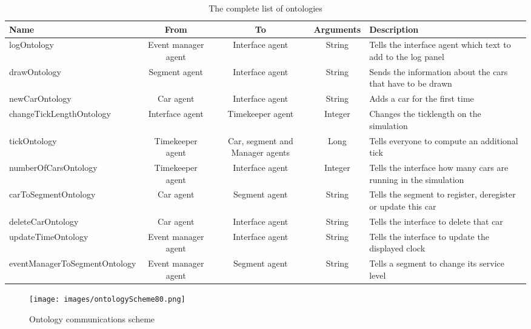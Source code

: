 \begin{table}[h]
\centering
\begin{adjustbox}{angle=90}    

\begin{tabularx}{\textheight}{|X|c|c|c|X|}
\hline 
\textbf{Name} & \textbf{From} & \textbf{To} & \textbf{Arguments} & \textbf{Description} \\ 
\hline 
logOntology & Event manager agent & Interface agent & String & Tells the interface agent which text to add to the log panel \\ 
\hline 
drawOntology & Segment agent & Interface agent & String & Sends the information about the cars that have to be drawn \\ 
\hline 
newCarOntology & Car agent & Interface agent & String & Adds a car for the first time \\ 
\hline 
changeTickLengthOntology & Interface agent & Timekeeper agent & Integer & Changes the ticklength on the simulation \\ 
\hline 
tickOntology & Timekeeper agent & Car, segment and Manager agents & Long & Tells everyone to compute an additional tick \\ 
\hline 
numberOfCarsOntology & Timekeeper agent & Interface agent & Integer & Tells the interface how many cars are running in the simulation \\ 
\hline 
carToSegmentOntology & Car agent & Segment agent & String & Tells the segment to register, deregister or update this car \\ 
\hline 
deleteCarOntology & Car agent & Interface agent & String & Tells the interface to delete that car \\ 
\hline 
updateTimeOntology & Event manager agent & Interface agent & String & Tells the interface to update the displayed clock \\ 
\hline 
eventManagerToSegmentOntology & Event manager agent & Segment agent & String & Tells a segment to change its service level \\ 
\hline 
\end{tabularx}
\end{adjustbox}
\caption{The complete list of ontologies}
\label{ontologiesTable}
\end{table}

\begin{figure}[!ht]
  \centering
  \texttt{[image: images/ontologyScheme80.png]} 
  \caption{Ontology communications scheme}
  \label{ontologyScheme}
\end{figure}

